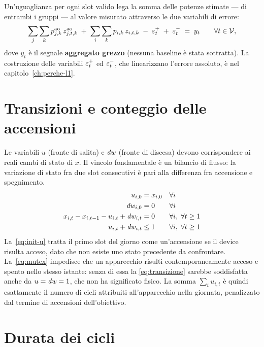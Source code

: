 Un'uguaglianza per ogni slot valido lega la somma delle potenze stimate --- di entrambi i gruppi
--- al valore misurato attraverso le due variabili di errore:
\begin{equation}
  \sum_{j} \sum_{k} p^{\text{ao}}_{j,k} \, z^{\text{ao}}_{j,t,k}
  \;+\;
  \sum_{i} \sum_{k} p_{i,k} \, z_{i,t,k}
  \;-\; \varepsilon^{+}_t \;+\; \varepsilon^{-}_t \;=\; y_t
  \qquad \forall t \in \mathcal{V} ,
  \label{eq:ricostruzione-base}
\end{equation}
dove $y_t$ è il segnale \textbf{aggregato grezzo} (nessuna baseline è stata sottratta). La
costruzione delle variabili $\varepsilon^{+}_t$ ed $\varepsilon^{-}_t$, che linearizzano l'errore assoluto, è nel
capitolo~\ref{ch:perche-l1}.

\section{Transizioni e conteggio delle accensioni}

Le variabili $u$ (fronte di salita) e $\mathit{dw}$ (fronte di discesa) devono corrispondere ai reali
cambi di stato di $x$. Il vincolo fondamentale è un bilancio di flusso: la variazione di stato fra
due slot consecutivi è pari alla differenza fra accensione e spegnimento.
\begin{align}
  u_{i,0} &= x_{i,0} && \forall i \label{eq:init-u}\\
  \mathit{dw}_{i,0} &= 0 && \forall i \label{eq:init-dw}\\
  x_{i,t} - x_{i,t-1} - u_{i,t} + \mathit{dw}_{i,t} &= 0 && \forall i,\; \forall t \ge 1 \label{eq:transizione}\\
  u_{i,t} + \mathit{dw}_{i,t} &\le 1 && \forall i,\; \forall t \ge 1 \label{eq:mutex}
\end{align}
La~\eqref{eq:init-u} tratta il primo slot del giorno come un'accensione se il device risulta
acceso, dato che non esiste uno stato precedente da confrontare. La~\eqref{eq:mutex} impedisce che
un apparecchio risulti contemporaneamente acceso e spento nello stesso istante: senza di essa la
\eqref{eq:transizione} sarebbe soddisfatta anche da $u = \mathit{dw} = 1$, che non ha significato fisico.
La somma $\sum_t u_{i,t}$ è quindi esattamente il numero di cicli attribuiti all'apparecchio nella
giornata, penalizzato dal termine di accensioni dell'obiettivo.

\section{Durata dei cicli}
\label{sec:durata}

